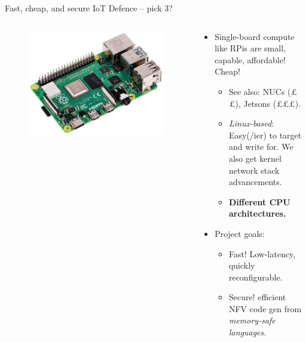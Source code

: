 \documentclass[aspectratio=169,xcolor={dvipsnames}
]{beamer}
\begin{document}
\begin{frame}{Fast, cheap, and secure IoT Defence -- pick 3?}
	\begin{columns}
		\begin{column}{0.4\linewidth}
			\begin{figure}
				\includegraphics[keepaspectratio,width=\linewidth]{images/rpi}
			\end{figure}
		\end{column}
		\begin{column}{0.6\linewidth}
			\begin{itemize}
				\item Single-board compute like RPis are small, capable, affordable! \alert{Cheap!}
				\begin{itemize}
					\item See also: NUCs (££), Jetsons (£££).
					\item \emph{Linux-based}: Easy(/ier) to target and write for. \alert{We also get kernel network stack advancements.}
					\item \textbf{Different CPU architectures.}
				\end{itemize}
				\item Project goals:
				\begin{itemize}
					\item \alert{Fast!} Low-latency, quickly reconfigurable.
					\item \alert{Secure!} efficient NFV code gen from \emph{memory-safe languages}.
				\end{itemize}
			\end{itemize}
		\end{column}
	\end{columns}
\end{frame}
\end{document}

